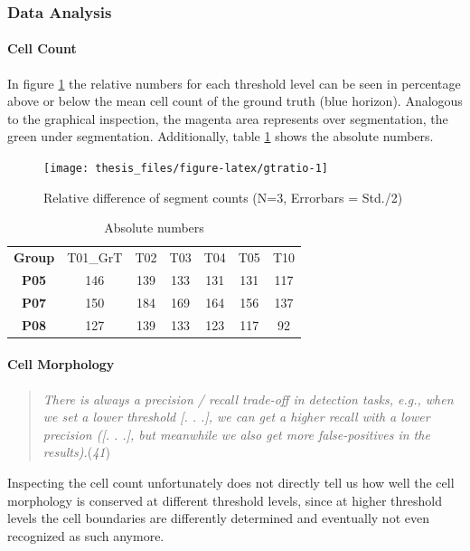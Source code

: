 \documentclass[11pt,singlespacinge,twoside]{reedthesis} %
\begin{document}
\hypertarget{data-analysis-1}{%
\subsubsection{Data Analysis}\label{data-analysis-1}}

\hypertarget{cell-count}{%
\paragraph{Cell Count}\label{cell-count}}

In figure \ref{fig:gtratio} the relative numbers for each threshold level can be seen in percentage above or below the mean cell count of the ground truth (blue horizon). Analogous to the graphical inspection, the magenta area represents over segmentation, the green under segmentation. Additionally, table \ref{tab:gtrcellcount} shows the absolute numbers.


\begin{figure}

{\centering \texttt{[image: thesis\_files/figure-latex/gtratio-1]} 

}

\caption[Relative difference of segment counts]{Relative difference of segment counts (N=3, Errorbars = Std./2)}\label{fig:gtratio}
\end{figure}
\begin{longtable}[]{@{}ccccccc@{}}
\caption{\label{tab:gtrcellcount} Absolute numbers}\tabularnewline
\toprule
\endhead
\textbf{Group} & T01\_GrT & T02 & T03 & T04 & T05 & T10\tabularnewline
\textbf{P05} & 146 & 139 & 133 & 131 & 131 & 117\tabularnewline
\textbf{P07} & 150 & 184 & 169 & 164 & 156 & 137\tabularnewline
\textbf{P08} & 127 & 139 & 133 & 123 & 117 & 92\tabularnewline
\bottomrule
\end{longtable}
\hypertarget{cell-morphology}{%
\paragraph{Cell Morphology}\label{cell-morphology}}
\begin{quote}
\emph{There is always a precision / recall trade-off in detection tasks, e.g., when we set a lower threshold {[}. . .{]}, we can get a higher recall with a lower precision ({[}. . .{]}, but meanwhile we also get more false-positives in the results).}(\emph{41})
\end{quote}
Inspecting the cell count unfortunately does not directly tell us how well the cell morphology is conserved at different threshold levels, since at higher threshold levels the cell boundaries are differently determined and eventually not even recognized as such anymore.
\end{document}
